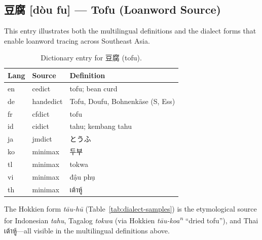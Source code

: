 \documentclass[11pt,a4paper]{article}
\newcommand{\thi}[1]{\foreignlanguage{thai}{#1}}
\begin{document}
\subsection{豆腐 [dòu fu] --- Tofu (Loanword Source)}

This entry illustrates both the multilingual definitions and the dialect forms that enable loanword tracing across Southeast Asia.

\begin{table}[H]
\centering
\footnotesize
\begin{tabular}{llp{3.6cm}}
\toprule
\textbf{Lang} & \textbf{Source} & \textbf{Definition} \\
\midrule
en & cedict & tofu; bean curd \\
de & handedict & Tofu, Doufu, Bohnenkäse (S, Ess) \\
fr & cfdict & tofu \\
id & cidict & tahu; kembang tahu \\
ja & jmdict & とうふ \\
ko & minimax & 두부 \\
tl & minimax & tokwa \\
vi & minimax & đậu phụ \\
th & minimax & \thi{เต้าหู้} \\
\bottomrule
\end{tabular}
\caption{Dictionary entry for 豆腐 (tofu).}
\end{table}

\noindent The Hokkien form \textit{tāu-hū} (Table~\ref{tab:dialect-samples}) is the etymological source for Indonesian \textit{tahu}, Tagalog \textit{tokwa} (via Hokkien \textit{tāu-koa\textsuperscript{n}} ``dried tofu''), and Thai \thi{เต้าหู้}---all visible in the multilingual definitions above.

\end{document}
